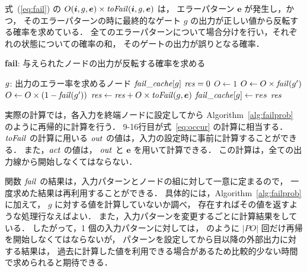 式~(\ref{eq:fail}) の $O({\bm i}, g, {\bm e}) \times {\it toFail}({\bm i}, g, {\bm e})$ は，
エラーパターン ${\bm e}$ が発生し，かつ，
そのエラーパターンの時に最終的なゲート $g$ の出力が正しい値から反転する確率を求めている．
全てのエラーパターンについて場合分けを行い，それぞれの状態についての確率の和，
そのゲートの出力が誤りとなる確率．

\begin{algorithm}[tbp]
  \caption{{\bf fail}: 与えられたノードの出力が反転する確率を求める}
  \label{alg:failprob}
  \begin{algorithmic}[1]
    \REQUIRE ${\it g}$: 出力のエラー率を求めるノード
    \ENDIF
      \RETURN ${\it fail\_cache}[g]$
    \ENDIF
    \STATE ${\it res} = 0$
      \STATE $O \leftarrow 1$
          \STATE $O \leftarrow O \times {\it fail}(g')$
        \ELSE
          \STATE $O \leftarrow O \times (1 - {\it fail}(g'))$
        \ENDIF
      \ENDFOR
      \STATE ${\it res} \leftarrow {\it res} + O \times {\it toFail}(g, {\bm e})$
    \ENDFOR
    \STATE ${\it fail\_cache}[g] \leftarrow res$
    \RETURN ${\it res}$
  \end{algorithmic}
\end{algorithm}
実際の計算では，各入力を終端ノードに設定してから Algorithm~\ref{alg:failprob} のように再帰的に計算を行う．
9-16行目が式~\ref{eq:occur} の計算に相当する．
${\it toFail}$ の計算に用いる ${\it out}$ の値は，入力の設定時に事前に計算することができる．
また，${\it act}$ の値は， ${\it out}$ と ${\bm e}$ を用いて計算できる．
この計算は，全ての出力線から開始しなくてはならない．

関数 ${\it fail}$ の結果は，入力パターンとノードの組に対して一意に定まるので，
一度求めた結果は再利用することができる．
具体的には，Algorithm~\ref{alg:failprob} に加えて， $g$ に対する値を計算していないか調べ，
存在すればその値を返すような処理行なえばよい．
また，入力パターンを変更するごとに計算結果をしている．
したがって，1 個の入力パターンに対しては，
 のように $|PO|$ 回だけ再帰を開始しなくてはならないが，
パターンを設定してから目以降の外部出力に対する結果は，
過去に計算した値を利用できる場合があるため比較的少ない時間で求められると期待できる．

